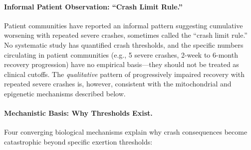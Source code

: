 \paragraph{Informal Patient Observation: ``Crash Limit Rule.''}
Patient communities have reported an informal pattern suggesting cumulative worsening with repeated severe crashes, sometimes called the ``crash limit rule.'' No systematic study has quantified crash thresholds, and the specific numbers circulating in patient communities (e.g., 5 severe crashes, 2-week to 6-month recovery progression) have no empirical basis---they should not be treated as clinical cutoffs. The \emph{qualitative} pattern of progressively impaired recovery with repeated severe crashes is, however, consistent with the mitochondrial and epigenetic mechanisms described below.

\paragraph{Mechanistic Basis: Why Thresholds Exist.}

Four converging biological mechanisms explain why crash consequences become catastrophic beyond specific exertion thresholds:

